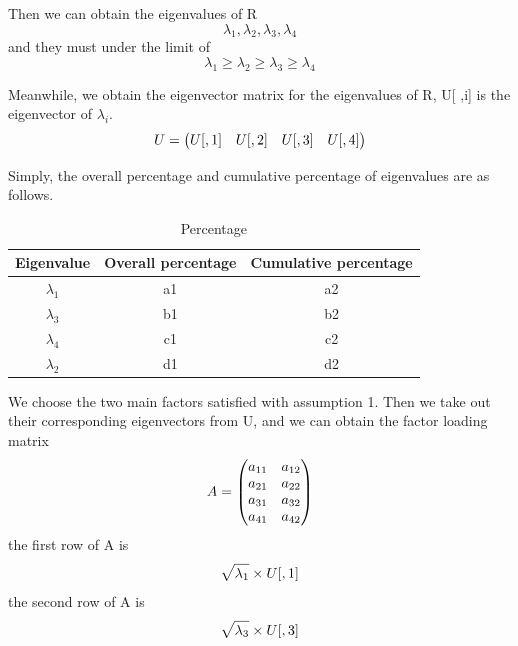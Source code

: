 \documentclass[a4paper,11pt]{article}
\begin{document}
\par Then we can obtain the eigenvalues of R
\[
\lambda_1, \lambda_2, \lambda_3, \lambda_4
\]
and they must under the limit of
\[
    \lambda_1 \geqslant \lambda_2 \geqslant \lambda_3 \geqslant \lambda_4
\]
\par Meanwhile, we obtain the eigenvector matrix for the eigenvalues of R, U[ ,i] is the eigenvector of $\lambda_i$.
\begin{equation}
    \centering
U=\begin{pmatrix} U[ ,1] & U[ ,2] & U[ ,3] & U[ ,4]\end{pmatrix}
\end{equation}
\par Simply, the overall percentage and cumulative percentage of eigenvalues are as follows.
\begin{table}[!hbp]
    \centering 
    \begin{tabular}{|c|c|c|}
\hline
Eigenvalue & Overall percentage & Cumulative percentage \\
\hline
$\lambda_1$ & a1 & a2 \\
\hline
$\lambda_3$ & b1 & b2 \\
\hline
$\lambda_4$ & c1 & c2 \\
\hline
$\lambda_2$ & d1 & d2 \\
\hline
\end{tabular}
\caption{Percentage}
\end{table}
\par We choose the two main factors satisfied with assumption 1. Then we take out their corresponding eigenvectors from U, and we can obtain the factor loading matrix
\begin{equation}
    \centering
A=\begin{pmatrix} a_{11} & a_{12} \\ a_{21} & a_{22} \\ a_{31} & a_{32} \\ a_{41} & a_{42}\end{pmatrix}
\end{equation}
the first row of A is
\begin{equation}
    \centering
\sqrt{\lambda_1} \times U[ ,1]
\end{equation}
the second row of A is
\begin{equation}
    \centering
\sqrt{\lambda_3} \times U[ ,3]
\end{equation}
\end{document}
